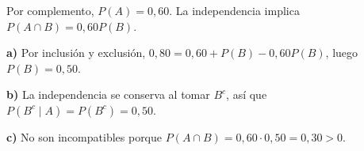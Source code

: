 Por complemento, $P(A)=0{,}60$. La independencia implica $P(A\cap B)=0{,}60P(B)$.

\textbf{a)} Por inclusión y exclusión, $0{,}80=0{,}60+P(B)-0{,}60P(B)$, luego $\boxed{P(B)=0{,}50}$.

\textbf{b)} La independencia se conserva al tomar $B^c$, así que $P(B^c\mid A)=P(B^c)=\boxed{0{,}50}$.

\textbf{c)} No son incompatibles porque $P(A\cap B)=0{,}60\cdot0{,}50=0{,}30>0$.
